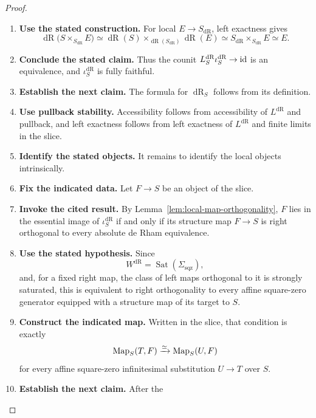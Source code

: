 \begin{proof}
\leavevmode
\begin{enumerate}[label=\textup{(\arabic*)}]
    \item \textbf{Use the stated construction.}
    For local \(E\to S_{\mathrm{dR}}\), left exactness gives
    \[
    \operatorname{dR}\bigl(S\times_{S_{\mathrm{dR}}}E\bigr)
    \simeq
    \operatorname{dR}(S)
    \times_{\operatorname{dR}(S_{\mathrm{dR}})}
    \operatorname{dR}(E)
    \simeq
    S_{\mathrm{dR}}\times_{S_{\mathrm{dR}}}E
    \simeq E.
    \]
    \item \textbf{Conclude the stated claim.}
    Thus the counit
    \(L^{\mathrm{dR}}_S\iota^{\mathrm{dR}}_S\to\operatorname{id}\) is an equivalence, and
    \(\iota^{\mathrm{dR}}_S\) is fully faithful.
    \item \textbf{Establish the next claim.}
    The formula for
    \(\operatorname{dR}_S\) follows from its definition.
    \item \textbf{Use pullback stability.}
    Accessibility follows from accessibility of \(L^{\mathrm{dR}}\) and pullback,
    and left exactness follows from left exactness of \(L^{\mathrm{dR}}\) and finite
    limits in the slice.
    \item \textbf{Identify the stated objects.}
    It remains to identify the local objects intrinsically.
    \item \textbf{Fix the indicated data.}
    Let
    \(F\to S\) be an object of the slice.
    \item \textbf{Invoke the cited result.}
    By
    Lemma~\ref{lem:local-map-orthogonality}, \(F\) lies in the essential image of
    \(\iota^{\mathrm{dR}}_S\) if and only if its structure map \(F\to S\) is right orthogonal to every
    absolute de Rham equivalence.
    \item \textbf{Use the stated hypothesis.}
    Since
    \[
    W^{\mathrm{dR}}=\operatorname{Sat}(\Sigma_{\mathrm{sqz}}),
    \]
    and, for a fixed right map, the class of left maps orthogonal to it is strongly
    saturated, this is equivalent to right orthogonality to every affine square-zero
    generator equipped with a structure map of its target to \(S\).
    \item \textbf{Construct the indicated map.}
    Written in the
    slice, that condition is exactly
    \[
    \operatorname{Map}_S(T,F)\xrightarrow{\simeq}\operatorname{Map}_S(U,F)
    \]
    for every affine square-zero infinitesimal substitution \(U\to T\) over \(S\).
    \item \textbf{Establish the next claim.}
    After the

\end{enumerate}
\end{proof}

